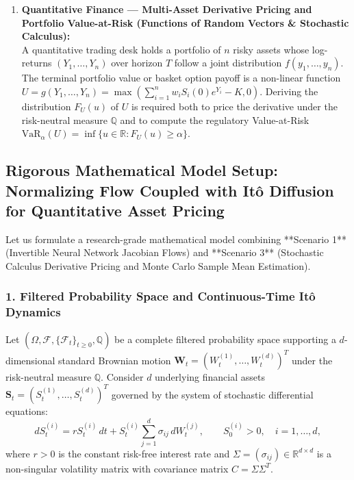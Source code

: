\documentclass[11pt, letterpaper]{article}
\theoremstyle{definition}
\theoremstyle{remark}
\newcommand{\R}{\mathbb{R}}
\newcommand{\F}{\mathcal{F}}
\begin{document}
\begin{enumerate}[label=\textbf{Scenario \arabic*:}]
    \item \textbf{Quantitative Finance — Multi-Asset Derivative Pricing and Portfolio Value-at-Risk (Functions of Random Vectors \& Stochastic Calculus):} \\ \relax
    A quantitative trading desk holds a portfolio of $n$ risky assets whose log-returns $(Y_1, \dots, Y_n)$ over horizon $T$ follow a joint distribution $f(y_1, \dots, y_n)$. The terminal portfolio value or basket option payoff is a non-linear function $U = g(Y_1, \dots, Y_n) = \max\left(\sum_{i=1}^n w_i S_i(0)e^{Y_i} - K, 0\right)$. Deriving the distribution $F_U(u)$ of $U$ is required both to price the derivative under the risk-neutral measure $\mathbb{Q}$ and to compute the regulatory Value-at-Risk $\text{VaR}_{\alpha}(U) = \inf\{u \in \R : F_U(u) \ge \alpha\}$.
\end{enumerate}

\subsection{Rigorous Mathematical Model Setup: Normalizing Flow Coupled with It\^o Diffusion for Quantitative Asset Pricing}

Let us formulate a research-grade mathematical model combining **Scenario 1** (Invertible Neural Network Jacobian Flows) and **Scenario 3** (Stochastic Calculus Derivative Pricing and Monte Carlo Sample Mean Estimation).

\subsubsection*{1. Filtered Probability Space and Continuous-Time It\^o Dynamics}
Let $(\Omega, \F, \{\F_t\}_{t \ge 0}, \mathbb{Q})$ be a complete filtered probability space supporting a $d$-dimensional standard Brownian motion $\mathbf{W}_t = (W_t^{(1)}, \dots, W_t^{(d)})^T$ under the risk-neutral measure $\mathbb{Q}$. Consider $d$ underlying financial assets $\mathbf{S}_t = (S_t^{(1)}, \dots, S_t^{(d)})^T$ governed by the system of stochastic differential equations:
\[
    dS_t^{(i)} = r S_t^{(i)} \, dt + S_t^{(i)} \sum_{j=1}^{d} \sigma_{ij} \, dW_t^{(j)}, \qquad S_0^{(i)} > 0, \quad i = 1, \dots, d,
\]
where $r > 0$ is the constant risk-free interest rate and $\Sigma = (\sigma_{ij}) \in \R^{d \times d}$ is a non-singular volatility matrix with covariance matrix $C = \Sigma \Sigma^T$.
\end{document}
